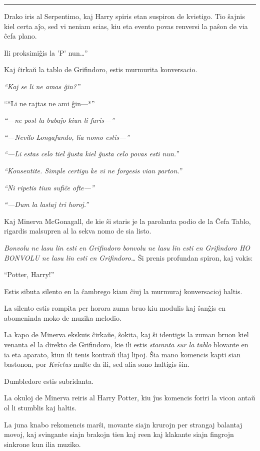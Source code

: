 \begin{center}\rule{3in}{0.4pt}\end{center}

Drako iris al Serpentimo, kaj Harry spiris etan suspiron de
kvietigo. Tio ŝajnis kiel certa aĵo, sed vi neniam scias, kiu eta
evento povas renversi la paŝon de via ĉefa plano.

Ili proksimiĝis la 'P' nun\ldots''

Kaj ĉirkaŭ la tablo de Grifindoro, estis murmurita konversacio.

\emph{``Kaj se li ne amas ĝin?''}

``*Li ne rajtas ne ami ĝin—*''

\emph{``—ne post la bubaĵo kiun li faris—''}

\emph{``—Nevilo Longafundo, lia nomo estis—''}

\emph{``—Li estas celo tiel ĝusta kiel ĝusta celo povas esti nun.''}

\emph{``Konsentite. Simple certigu ke vi ne forgesis vian parton.''}

\emph{``Ni ripetis tiun sufiĉe ofte—''}

\emph{``—Dum la lastaj tri horoj.''}

Kaj Minerva McGonagall, de kie ŝi staris je la parolanta podio de la
Ĉefa Tablo, rigardis malsupren al la sekva nomo de sia listo.

\emph{Bonvolu ne lasu lin esti en Grifindoro bonvolu ne lasu lin esti
  en Grifindoro HO BONVOLU ne lasu lin esti en Grifindoro\ldots} Ŝi
prenis profundan spiron, kaj vokis:

``Potter, Harry!''

Estis sibuta silento en la ĉambrego kiam ĉiuj la murmuraj konversacioj
haltis.

La silento estis rompita per horora zuma bruo kiu modulis kaj ŝanĝis
en abomeninda moko de muzika melodio.

La kapo de Minerva ekskuis ĉirkaŭe, ŝokita, kaj ŝi identigis la zuman
bruon kiel venanta el la direkto de Grifindoro, kie ili estis
\emph{staranta sur la tablo} blovante en ia eta aparato, kiun ili
tenis kontraŭ iliaj lipoj. Ŝia mano komencis kapti sian bastonon, por
\emph{Kvietus} multe da ili, sed alia sono haltigis ŝin.

Dumbledore estis subridanta.

La okuloj de Minerva reiris al Harry Potter, kiu ĵus komencis foriri
la vicon antaŭ ol li stumblis kaj haltis.

La juna knabo rekomencis marŝi, movante siajn krurojn per strangaj
balantaj movoj, kaj svingante siajn brakojn tien kaj reen kaj klakante
siajn fingrojn sinkrone kun ilia muziko.

